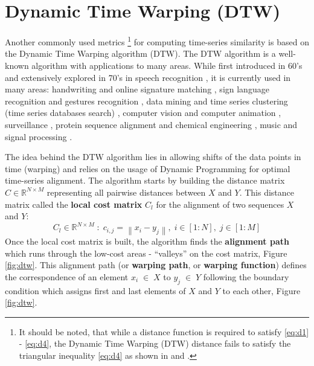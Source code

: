 \section{Dynamic Time Warping (DTW)}\label{dtw}
Another commonly used metrics 
\footnote{It should be noted, that while a distance function is required to satisfy \ref{eq:d1} - \ref{eq:d4}, the Dynamic Time Warping (DTW) distance fails to satisfy the triangular inequality \ref{eq:d4} as shown in \cite{citeulike:4343286} and \cite{citeulike:4343933}.}
for computing time-series similarity is based on the Dynamic Time Warping algorithm (DTW). The DTW algorithm is a well-known algorithm with applications to many areas. While first introduced in 60's \cite{citeulike:3733907} and extensively explored in 70's in speech recognition \cite{citeulike:603020}, \cite{citeulike:3496861} it is currently used in many areas: handwriting and online signature matching \cite{citeulike:2838910} \cite{citeulike:2584345}, sign language recognition \cite{citeulike:3789957} and gestures recognition \cite{citeulike:3789964} \cite{citeulike:3789957}, data mining and time series clustering (time series databases search) \cite{citeulike:3815076} \cite{citeulike:3733893} \cite{citeulike:3788783} \cite{citeulike:3731715} \cite{citeulike:3731713} \cite{citeulike:3789897}, computer vision and computer animation \cite{citeulike:3728229}, surveillance \cite{citeulike:964832}, protein sequence alignment and chemical engineering \cite{citeulike:3733894}, music and signal processing \cite{citeulike:3736775} \cite{citeulike:3728229} \cite{citeulike:3728228}.

The idea behind the DTW algorithm lies in allowing shifts of the data points in time (warping) and relies on the usage of Dynamic Programming \cite{citeulike:3733907} for optimal time-series alignment. The algorithm starts by building the distance matrix $C \in \mathbb{R}^{N \times M}$ representing all pairwise distances between $X$ and $Y$. This distance matrix called the \textbf{local cost matrix} $C_{l}$ for the alignment of two sequences $X$ and $Y$:
\begin{equation}
\label{eq:localcost}
C_{l} \in \mathbb{R}^{N \times M} \; : \; c_{i,j} = \left\| x_{i} - y_{j} \right\|, \; i \in [1:N], \; j \in [1:M]
\end{equation}
Once the local cost matrix is built, the algorithm finds the \textbf{alignment path} which runs through the low-cost areas - ``valleys'' on the cost matrix, Figure \ref{fig:dtw}. This alignment path (or \textbf{warping path}, or \textbf{warping function}) defines the correspondence of an element $x_{i} \; \in \; X$ to $y_{j} \; \in \; Y$ following the boundary condition which assigns first and last elements of $X$ and $Y$ to each other, Figure \ref{fig:dtw}.

